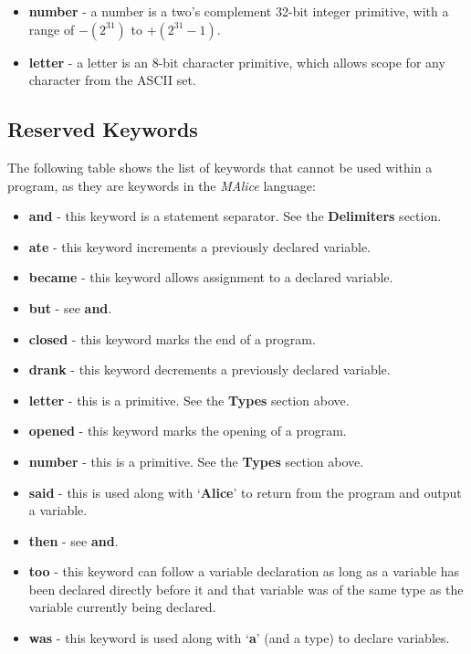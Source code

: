 \documentclass[11pt]{article}
\begin{document}
\begin{itemize}
  \item \textbf{number} - a number is a two's complement 32-bit integer 
  primitive, with a range of \( -(2^{31}) \) to \( +(2^{31} - 1) \). 
  \item \textbf{letter} - a letter is an 8-bit character primitive, which 
  allows scope for any character from the ASCII set.
\end{itemize}

\subsection*{Reserved Keywords}
The following table shows the list of keywords that cannot be used within a program, as they are keywords in the \emph{MAlice} language:

\begin{itemize}
  \item \textbf{and} - this keyword is a statement separator. See the \textbf{Delimiters} section.
  \item \textbf{ate} - this keyword increments a previously declared variable.
  \item \textbf{became} - this keyword allows assignment to a declared variable.
  \item \textbf{but} - see \textbf{and}.
  \item \textbf{closed} - this keyword marks the end of a program.
  \item \textbf{drank} - this keyword decrements a previously declared variable.
  \item \textbf{letter} - this is a primitive. See the \textbf{Types} section above.
  \item \textbf{opened} - this keyword marks the opening of a program.
  \item \textbf{number} - this is a primitive. See the \textbf{Types} section above.
  \item \textbf{said} - this is used along with \textquoteleft \textbf{Alice}\textquoteright{} to return from the program and output a variable.
  \item \textbf{then} - see \textbf{and}.
  \item \textbf{too} - this keyword can follow a variable declaration as long as a variable has been declared directly before it and that variable was of the same type as the variable currently being declared.
  \item \textbf{was} - this keyword is used along with \textquoteleft \textbf{a}\textquoteright{} (and a type) to declare variables.
\end{itemize}
\end{document}
